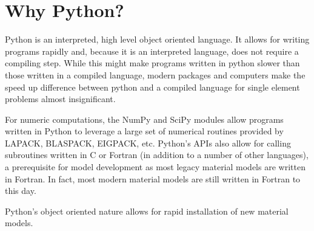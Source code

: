 \documentclass[12pt,report,strict]{SANDreport/SANDreport}
\begin{document}
\section{Why Python?}
\label{sec:why-python}
Python is an interpreted, high level object oriented language. It allows for
writing programs rapidly and, because it is an interpreted language, does not
require a compiling step. While this might make programs written in python
slower than those written in a compiled language, modern packages and
computers make the speed up difference between python and a compiled language
for single element problems almost insignificant.

For numeric computations, the NumPy and SciPy modules allow programs written
in Python to leverage a large set of numerical routines provided by LAPACK,
BLASPACK, EIGPACK, etc. Python's APIs also allow for calling subroutines
written in C or Fortran (in addition to a number of other languages), a
prerequisite for model development as most legacy material models are written
in Fortran. In fact, most modern material models are still written in Fortran
to this day.

Python's object oriented nature allows for rapid installation of new material
models.

\end{document}
